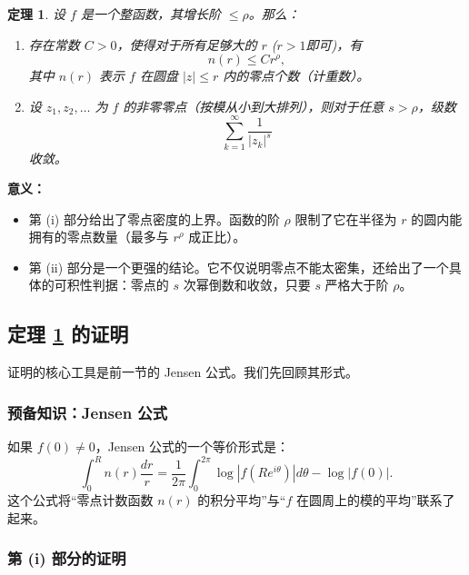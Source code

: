 \documentclass[UTF8]{ctexart}
\newtheorem{theorem}{定理}[section]
\numberwithin{equation}{section}
\begin{document}
\begin{theorem}\label{thm:order-growth}
设 \(f\) 是一个整函数，其增长阶 \(\le \rho\)。那么：
\begin{enumerate}
\item 存在常数 \(C > 0\)，使得对于所有足够大的 \(r\) (\(r > 1\)即可)，有
\begin{equation}
n(r) \le C r^\rho,
\end{equation}
其中 \(n(r)\) 表示 \(f\) 在圆盘 \(|z| \le r\) 内的零点个数（计重数）。
\item 设 \(z_1, z_2, \dots\) 为 \(f\) 的非零零点（按模从小到大排列），则对于任意 \(s > \rho\)，级数
\begin{equation}
\sum_{k=1}^\infty \frac{1}{|z_k|^s}
\end{equation}
收敛。
\end{enumerate}
\end{theorem}

\textbf{意义：}
\begin{itemize}
\item 第 (i) 部分给出了零点密度的上界。函数的阶 \(\rho\) 限制了它在半径为 \(r\) 的圆内能拥有的零点数量（最多与 \(r^\rho\) 成正比）。
\item 第 (ii) 部分是一个更强的结论。它不仅说明零点不能太密集，还给出了一个具体的可积性判据：零点的 \(s\) 次幂倒数和收敛，只要 \(s\) 严格大于阶 \(\rho\)。
\end{itemize}

\subsection{定理 \ref{thm:order-growth} 的证明}

证明的核心工具是前一节的 Jensen 公式。我们先回顾其形式。

\subsubsection{预备知识：Jensen 公式}

如果 \(f(0) \neq 0\)，Jensen 公式的一个等价形式是：
\begin{equation}\label{eq:jensen}
\int_0^R n(r) \frac{dr}{r} = \frac{1}{2\pi} \int_0^{2\pi} \log |f(R e^{i\theta})| d\theta - \log |f(0)|.
\end{equation}
这个公式将“零点计数函数 \(n(r)\) 的积分平均”与“\(f\) 在圆周上的模的平均”联系了起来。

\subsubsection{第 (i) 部分的证明}
\end{document}

